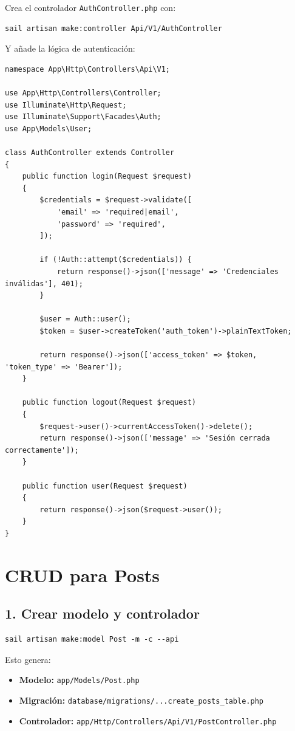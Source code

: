 \documentclass[11pt]{article}
\begin{document}
Crea el controlador \texttt{AuthController.php} con:

\begin{verbatim}
sail artisan make:controller Api/V1/AuthController
\end{verbatim}

Y añade la lógica de autenticación:

\begin{verbatim}
namespace App\Http\Controllers\Api\V1;

use App\Http\Controllers\Controller;
use Illuminate\Http\Request;
use Illuminate\Support\Facades\Auth;
use App\Models\User;

class AuthController extends Controller
{
    public function login(Request $request)
    {
        $credentials = $request->validate([
            'email' => 'required|email',
            'password' => 'required',
        ]);

        if (!Auth::attempt($credentials)) {
            return response()->json(['message' => 'Credenciales inválidas'], 401);
        }

        $user = Auth::user();
        $token = $user->createToken('auth_token')->plainTextToken;

        return response()->json(['access_token' => $token, 'token_type' => 'Bearer']);
    }

    public function logout(Request $request)
    {
        $request->user()->currentAccessToken()->delete();
        return response()->json(['message' => 'Sesión cerrada correctamente']);
    }

    public function user(Request $request)
    {
        return response()->json($request->user());
    }
}
\end{verbatim}

\section{CRUD para Posts}
\label{sec:orgabe6152}

\subsection{1. Crear modelo y controlador}
\label{sec:orge08e041}

\begin{verbatim}
sail artisan make:model Post -m -c --api
\end{verbatim}

Esto genera:
\begin{itemize}
\item \textbf{\textbf{Modelo:}} \texttt{app/Models/Post.php}
\item \textbf{\textbf{Migración:}} \texttt{database/migrations/...create\_posts\_table.php}
\item \textbf{\textbf{Controlador:}} \texttt{app/Http/Controllers/Api/V1/PostController.php}
\end{itemize}
\end{document}
